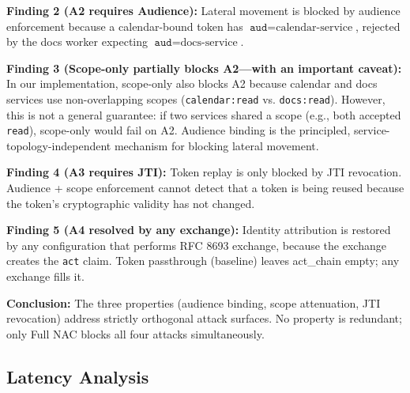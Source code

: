 \documentclass[journal]{IEEEtran}
\begin{document}
\textbf{Finding 2 (A2 requires Audience):} Lateral movement is blocked by audience enforcement because a calendar-bound token has $\texttt{aud} = \text{calendar-service}$, rejected by the docs worker expecting $\texttt{aud} = \text{docs-service}$.

\textbf{Finding 3 (Scope-only partially blocks A2—with an important caveat):} In our implementation, scope-only also blocks A2 because calendar and docs services use non-overlapping scopes (\texttt{calendar:read} vs. \texttt{docs:read}). However, this is not a general guarantee: if two services shared a scope (e.g., both accepted \texttt{read}), scope-only would fail on A2. Audience binding is the principled, service-topology-independent mechanism for blocking lateral movement.

\textbf{Finding 4 (A3 requires JTI):} Token replay is only blocked by JTI revocation. Audience + scope enforcement cannot detect that a token is being reused because the token's cryptographic validity has not changed.

\textbf{Finding 5 (A4 resolved by any exchange):} Identity attribution is restored by any configuration that performs RFC 8693 exchange, because the exchange creates the \texttt{act} claim. Token passthrough (baseline) leaves act\_chain empty; any exchange fills it.

\textbf{Conclusion:} The three properties (audience binding, scope attenuation, JTI revocation) address strictly orthogonal attack surfaces. No property is redundant; only Full NAC blocks all four attacks simultaneously.


\subsection{Latency Analysis}
\label{sec:latency}
\end{document}
